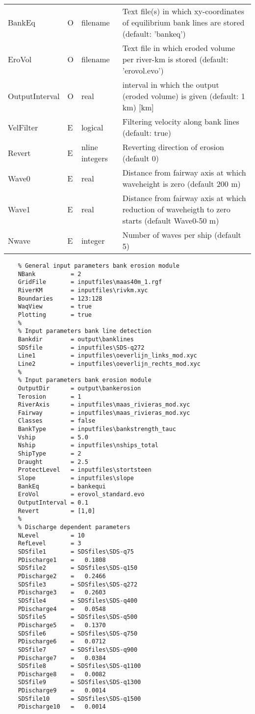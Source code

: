 \begin{tabular}{llll}
BankEq & O & filename & Text file(s) in which xy-coordinates of equilibrium bank lines are stored (default: 'bankeq') \\
EroVol & O & filename & Text file in which eroded volume per river-km is stored (default: 'erovol.evo') \\
OutputInterval & O & real & interval in which the output (eroded volume) is given (default: 1 km) [km] \\
VelFilter & E & logical & Filtering velocity along bank lines (default: true) \\
Revert & E & nline integers & Reverting direction of erosion (default 0) \\
Wave0 & E & real & Distance from fairway axis at which waveheight is zero (default 200 m) \\
Wave1 & E & real & Distance from fairway axis at which reduction of waveheigth to zero starts (default Wave0-50 m) \\
Nwave & E & integer & Number of waves per ship (default 5) \\
\end{tabular}

\begin{verbatim}
    % General input parameters bank erosion module
    NBank          = 2
    GridFile       = inputfiles\maas40m_1.rgf
    RiverKM        = inputfiles\rivkm.xyc
    Boundaries     = 123:128
    WaqView        = true
    Plotting       = true
    %
    % Input parameters bank line detection
    Bankdir        = output\banklines
    SDSfile        = inputfiles\SDS-q272
    Line1          = inputfiles\oeverlijn_links_mod.xyc
    Line2          = inputfiles\oeverlijn_rechts_mod.xyc
    %
    % Input parameters bank erosion module
    OutputDir      = output\bankerosion
    Terosion       = 1
    RiverAxis      = inputfiles\maas_rivieras_mod.xyc
    Fairway        = inputfiles\maas_rivieras_mod.xyc
    Classes        = false
    BankType       = inputfiles\bankstrength_tauc
    Vship          = 5.0
    Nship          = inputfiles\nships_total
    ShipType       = 2
    Draught        = 2.5
    ProtectLevel   = inputfiles\stortsteen
    Slope          = inputfiles\slope
    BankEq         = bankequi
    EroVol         = erovol_standard.evo
    OutputInterval = 0.1
    Revert         = [1,0]
    %
    % Discharge dependent parameters
    NLevel         = 10
    RefLevel       = 3
    SDSfile1       = SDSfiles\SDS-q75
    PDischarge1    =   0.1808
    SDSfile2       = SDSfiles\SDS-q150
    PDischarge2    =   0.2466
    SDSfile3       = SDSfiles\SDS-q272
    PDischarge3    =   0.2603
    SDSfile4       = SDSfiles\SDS-q400
    PDischarge4    =   0.0548
    SDSfile5       = SDSfiles\SDS-q500
    PDischarge5    =   0.1370
    SDSfile6       = SDSfiles\SDS-q750
    PDischarge6    =   0.0712
    SDSfile7       = SDSfiles\SDS-q900
    PDischarge7    =   0.0384
    SDSfile8       = SDSfiles\SDS-q1100
    PDischarge8    =   0.0082
    SDSfile9       = SDSfiles\SDS-q1300
    PDischarge9    =   0.0014
    SDSfile10      = SDSfiles\SDS-q1500
    PDischarge10   =   0.0014
\end{verbatim}

